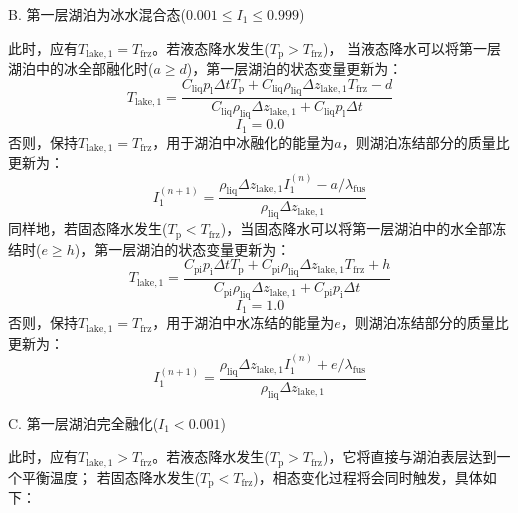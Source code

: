 B. 第一层湖泊为冰水混合态($0.001\leqslant I_1\leqslant 0.999$)

此时，应有$T_{\mathrm{lake,1}}=T_{\mathrm {frz}} $。若液态降水发生($T_{\mathrm {p}} >T_{\mathrm {frz}} $)，
当液态降水可以将第一层湖泊中的冰全部融化时($a\geqslant d$)，第一层湖泊的状态变量更新为：
\begin{equation}
  T_{\mathrm{lake, 1}}=\frac{C_{\mathrm{liq}} p_{\mathrm{l}} \Delta t T_{\mathrm{p}}+C_{\mathrm{liq}} \rho_{\mathrm{liq}} \Delta z_{\mathrm{lake, 1}} T_{\mathrm {frz}}-d}{C_{\mathrm{liq}} \rho_{\mathrm{liq}} \Delta z_{\mathrm{lake, 1}}+C_{\mathrm{liq}} p_{\mathrm{l}} \Delta t}
\end{equation}
\begin{equation}
  I_{1}=0.0
\end{equation}
否则，保持$T_{\mathrm{lake,1}}=T_{\mathrm {frz}} $，用于湖泊中冰融化的能量为$a$，则湖泊冻结部分的质量比更新为：
\begin{equation}
  I_{1}^{(n+1)}=\frac{\rho_{\mathrm{liq}} \Delta z_{\mathrm{lake, 1}} I_{1}^{(n)}-a / \lambda_{\mathrm {fus}}}{\rho_{\mathrm{liq}} \Delta z_{\mathrm{lake, 1}}}
\end{equation}
同样地，若固态降水发生($T_{\mathrm {p}} <T_{\mathrm {frz}} $)，当固态降水可以将第一层湖泊中的水全部冻结时($e\geqslant h$)，第一层湖泊的状态变量更新为：
\begin{equation}
  T_{\mathrm{lake, 1}}=\frac{C_{\mathrm{p i}} p_{\mathrm{i}} \Delta t T_{\mathrm{p}}+C_{\mathrm{p i}} \rho_{\mathrm{liq}} \Delta z_{\mathrm{lake, 1}} T_{\mathrm {frz}}+h}{C_{\mathrm{p i}} \rho_{\mathrm{liq}} \Delta z_{\mathrm{lake, 1}}+C_{\mathrm{p i}} p_{\mathrm{i}} \Delta t}
\end{equation}
\begin{equation}
  I_{1}=1.0
\end{equation}
否则，保持$T_{\mathrm{lake,1}}=T_{\mathrm {frz}} $，用于湖泊中水冻结的能量为$e$，则湖泊冻结部分的质量比更新为：
\begin{equation}
  I_{1}^{(n+1)}=\frac{\rho_{\mathrm{liq}} \Delta z_{\mathrm{lake, 1}} I_{1}^{(n)}+e / \lambda_{\mathrm {fus}}}{\rho_{\mathrm{liq}} \Delta z_{\mathrm{lake, 1}}}
\end{equation}

C. 	第一层湖泊完全融化($I_1<0.001$)

此时，应有$T_{\mathrm{lake,1}}>T_{\mathrm {frz}} $。若液态降水发生($T_{\mathrm {p}} >T_{\mathrm {frz}} $)，它将直接与湖泊表层达到一个平衡温度；
若固态降水发生($T_{\mathrm {p}} <T_{\mathrm {frz}} $)，相态变化过程将会同时触发，具体如下：

